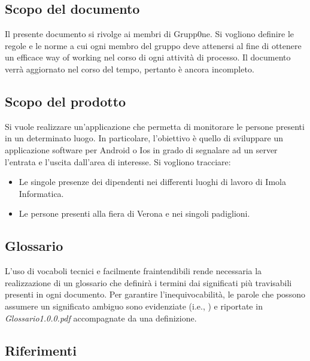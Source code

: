 \documentclass[../norme-di-progetto.tex]{subfiles}
\begin{document}
\subsection{Scopo del documento}
\label{sub:scopo del documento}
Il presente documento si rivolge ai membri di Grupp0ne. Si vogliono definire le regole e le norme a cui ogni membro del gruppo deve attenersi al fine di ottenere un efficace way of working nel corso di ogni attività di processo. Il documento verrà aggiornato nel corso del tempo, pertanto è ancora incompleto. 


\subsection{Scopo del prodotto}
\label{sub:scopo del prodotto}
Si vuole realizzare un'applicazione che permetta di monitorare le persone presenti in un determinato luogo. In particolare, l'obiettivo è quello di sviluppare un applicazione software per Android o Ios in grado di segnalare ad un server l'entrata e l'uscita dall'area di interesse.
Si vogliono tracciare:
\begin{itemize}
	\item Le singole presenze dei dipendenti nei differenti luoghi di lavoro di Imola Informatica.
	\item Le persone presenti alla fiera di Verona e nei singoli padiglioni.
\end{itemize}

\subsection{Glossario}
\label{sub:glossario}
L'uso di vocaboli tecnici e facilmente fraintendibili rende necessaria la realizzazione di un glossario che definirà i termini dai significati più travisabili presenti in ogni documento. Per garantire l'inequivocabilità, le parole che possono assumere un significato ambiguo sono evidenziate (i.e., ) e riportate in \textit{Glossario1.0.0.pdf} accompagnate da una definizione.

\subsection{Riferimenti}
\label{sub:riferimenti}
\end{document}

